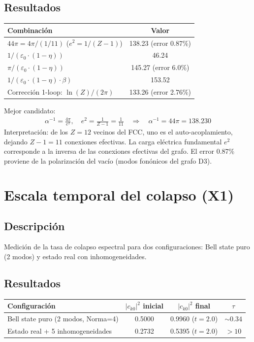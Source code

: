 \documentclass[12pt]{article}
\begin{document}
\subsection{Resultados}
\begin{center}
\begin{tabular}{lc}
\toprule
Combinaci\'on & Valor \\
\midrule
$44\pi = 4\pi/(1/11)$ ($e^2=1/(Z-1)$) & 138.23 (error 0.87\%) \\
$1/(\varepsilon_0\cdot(1-\eta))$ & 46.24 \\
$\pi/(\varepsilon_0\cdot(1-\eta))$ & 145.27 (error 6.0\%) \\
$1/(\varepsilon_0\cdot(1-\eta)\cdot\beta)$ & 153.52 \\
Correcci\'on 1-loop: $\ln(Z)/(2\pi)$ & 133.26 (error 2.76\%) \\
\bottomrule
\end{tabular}
\end{center}

Mejor candidato:
\begin{align}
  \alpha^{-1} = \frac{4\pi}{e^2},\quad e^2 = \frac{1}{Z-1} = \frac{1}{11}
  \quad\Longrightarrow\quad \alpha^{-1} = 44\pi = 138.230
\end{align}
Interpretaci\'on: de los $Z=12$ vecinos del FCC, uno es el auto-acoplamiento, dejando $Z-1=11$ conexiones efectivas. La carga el\'ectrica fundamental $e^2$ corresponde a la inversa de las conexiones efectivas del grafo. El error 0.87\% proviene de la polarizaci\'on del vac\'io (modos fon\'onicos del grafo D3).

\section{Escala temporal del colapso (X1)}

\subsection{Descripci\'on}
Medici\'on de la tasa de colapso espectral para dos configuraciones: Bell state puro (2 modos) y estado real con inhomogeneidades.

\subsection{Resultados}
\begin{center}
\begin{tabular}{lccc}
\toprule
Configuraci\'on & $|c_{k0}|^2$ inicial & $|c_{k0}|^2$ final & $\tau$ \\
\midrule
Bell state puro (2 modos, Norma=4) & 0.5000 & 0.9960 ($t=2.0$) & $\sim 0.34$ \\
Estado real + 5 inhomogeneidades & 0.2732 & 0.5395 ($t=2.0$) & $> 10$ \\
\bottomrule
\end{tabular}
\end{center}
\end{document}
